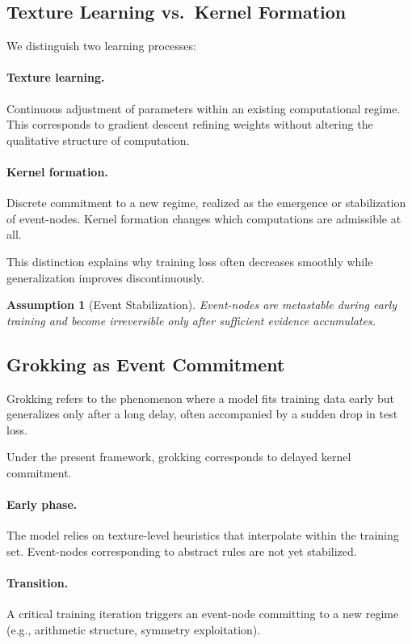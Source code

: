 \documentclass[11pt]{article}
\newtheorem{assumption}{Assumption}
\theoremstyle{remark}
\begin{document}
\subsection{Texture Learning vs.\ Kernel Formation}

We distinguish two learning processes:

\paragraph{Texture learning.}
Continuous adjustment of parameters within an existing computational
regime. This corresponds to gradient descent refining weights without
altering the qualitative structure of computation.

\paragraph{Kernel formation.}
Discrete commitment to a new regime, realized as the emergence or
stabilization of event-nodes. Kernel formation changes which
computations are admissible at all.

This distinction explains why training loss often decreases smoothly
while generalization improves discontinuously.

\begin{assumption}[Event Stabilization]
Event-nodes are metastable during early training and become
irreversible only after sufficient evidence accumulates.
\end{assumption}

\subsection{Grokking as Event Commitment}

Grokking refers to the phenomenon where a model fits training data
early but generalizes only after a long delay, often accompanied by a
sudden drop in test loss.

Under the present framework, grokking corresponds to delayed kernel
commitment.

\paragraph{Early phase.}
The model relies on texture-level heuristics that interpolate within
the training set. Event-nodes corresponding to abstract rules are not
yet stabilized.

\paragraph{Transition.}
A critical training iteration triggers an event-node committing to a
new regime (e.g., arithmetic structure, symmetry exploitation).
\end{document}

